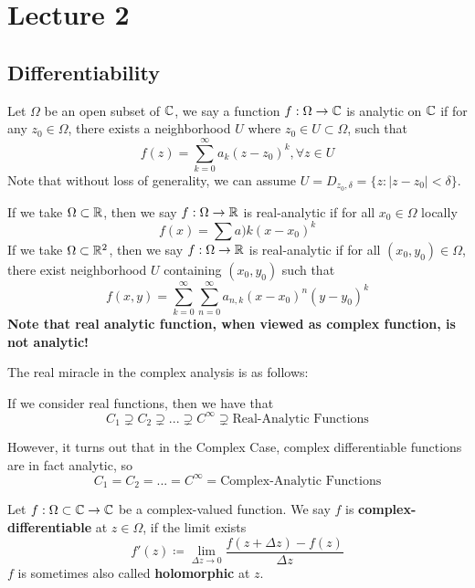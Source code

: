 \section{Lecture 2}

\subsection{Differentiability}

\begin{definition}
Let $\Omega$ be an open subset of $\mathbb{C}$, we say a function $f: \Omega \to \mathbb{C}$ is analytic on $\mathbb{C}$ if for any $z_0 \in \Omega$, there exists a neighborhood $U$ where $z_0 \in U \subset \Omega$, such that
\[f(z) = \sum_{k = 0}^\infty a_k (z - z_0)^k, \forall z \in U\]
Note that without loss of generality, we can assume $U = D_{z_0, \delta} = \{z: |z - z_0| < \delta\}$.
\end{definition}

\begin{remark}
    If we take $\Omega \subset \mathbb{R}$, then we say $f: \Omega \to \mathbb{R}$ is real-analytic if for all $x_0 \in \Omega$ locally
    \[f(x) = \sum a)k (x - x_0)^k\]
    If we take $\Omega \subset \mathbb{R}^2$, then we say $f: \Omega \to \mathbb{R}$ is real-analytic if for all $(x_0, y_0) \in \Omega$, there exist neighborhood $U$ containing $(x_0, y_0)$ such that
    \[f(x, y) = \sum_{k = 0}^\infty \sum_{n = 0}^\infty a_{n, k} (x - x_0)^n (y - y_0)^k\]
    \textbf{Note that real analytic function, when viewed as complex function, is not analytic!}
\end{remark}

The real miracle in the complex analysis is as follows:

If we consider real functions, then we have that
\[C_1 \supsetneq C_2 \supsetneq ... \supsetneq C^\infty \supsetneq \text{Real-Analytic Functions}\]

However, it turns out that in the Complex Case, complex differentiable functions are in fact analytic, so
\[C_1 = C_2 = ... = C^\infty = \text{Complex-Analytic Functions}\]


\begin{definition}
Let $f: \Omega \subset \mathbb{C} \to \mathbb{C}$ be a complex-valued function. We say $f$ is \textbf{complex-differentiable} at $z \in \Omega$, if the limit exists
\[f'(z) \coloneqq \lim_{\Delta z \to 0} \frac{f(z + \Delta z) - f(z)}{\Delta z}\]
$f$ is sometimes also called \textbf{holomorphic} at $z$.
\end{definition}

